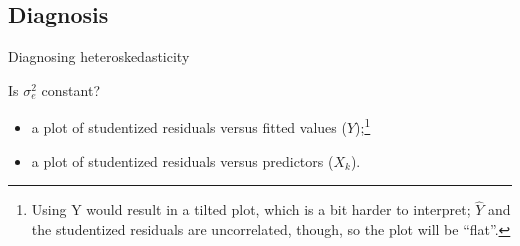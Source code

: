 \documentclass[12pt,english,pdf,xcolor=dvipsnames,aspectratio=169,handout]{beamer}\usepackage[]{graphicx}\usepackage[]{xcolor}
\begin{document}
\subsection{Diagnosis}

\begin{frame}{Diagnosing heteroskedasticity}

\begin{figure}
\centering
{}
\end{figure}

Is $\sigma_e^2$ constant?

\begin{itemize}
\item a plot of studentized residuals versus fitted values ($\hat{Y}$);\footnote{Using Y would result in a tilted plot, which is a bit harder to interpret; $\hat{Y}$ and the studentized residuals are uncorrelated, though, so the plot will be ``flat''.}
\item a plot of studentized residuals versus predictors ($X_k$).
\end{itemize}

\end{frame}
\end{document}
